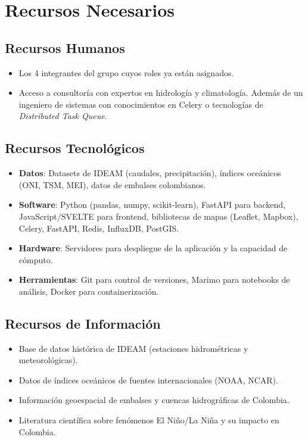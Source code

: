 \documentclass[12pt]{article}
\begin{document}
\section{Recursos Necesarios}

\subsection{Recursos Humanos}
\begin{itemize}
    \item Los 4 integrantes del grupo cuyos roles ya están asignados.
    \item Acceso a consultoría con expertos en hidrología y climatología. Además de un ingeniero de sistemas con conocimientos en Celery o tecnologías de \textit{Distributed Task Queue}.
\end{itemize}

\subsection{Recursos Tecnológicos}
\begin{itemize}
    \item \textbf{Datos}: Datasets de IDEAM (caudales, precipitación), índices oceánicos (ONI, TSM, MEI), datos de embalses colombianos.
    \item \textbf{Software}: Python (pandas, numpy, scikit-learn), FastAPI para backend, JavaScript/SVELTE para frontend, bibliotecas de mapas (Leaflet, Mapbox), Celery, FastAPI, Redis, InfluxDB, PostGIS.
    \item \textbf{Hardware}: Servidores para despliegue de la aplicación y la capacidad de cómputo.
    \item \textbf{Herramientas}: Git para control de versiones, Marimo para notebooks de análisis, Docker para containerización.
\end{itemize}

\subsection{Recursos de Información}
\begin{itemize}
    \item Base de datos histórica de IDEAM (estaciones hidrométricas y meteorológicas).
    \item Datos de índices oceánicos de fuentes internacionales (NOAA, NCAR).
    \item Información geoespacial de embalses y cuencas hidrográficas de Colombia.
    \item Literatura científica sobre fenómenos El Niño/La Niña y su impacto en Colombia.
\end{itemize}
\end{document}
